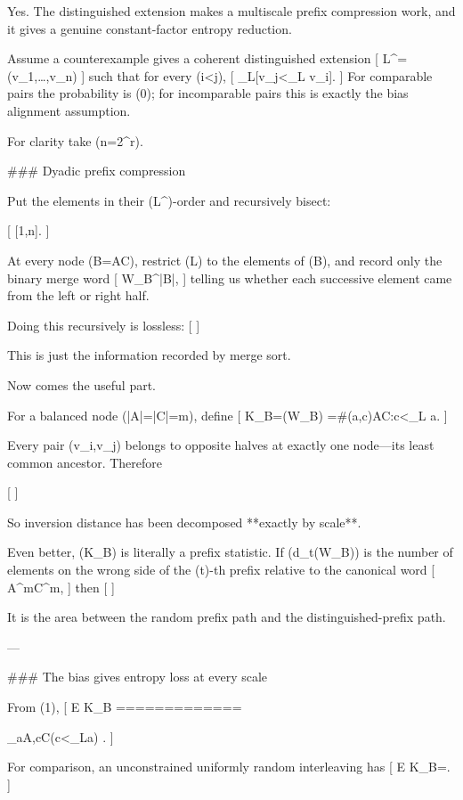 Yes. The distinguished extension makes a multiscale prefix compression work, and it gives a genuine constant-factor entropy reduction.

Assume a counterexample gives a coherent distinguished extension
[
L^\star=(v_1,\dots,v_n)
]
such that for every (i<j),
[
\Pr_L[v_j<_L v_i]\le {}.
]
For comparable pairs the probability is (0); for incomparable pairs this is exactly the bias alignment assumption.

For clarity take (n=2^r).

### Dyadic prefix compression

Put the elements in their (L^\star)-order and recursively bisect:

[
[1,n]\to [1,n/2]\cup[n/2+1,n]\to\cdots.
]

At every node (B=A\sqcup C), restrict (L) to the elements of (B), and record only the binary merge word
[
W_B^{|B|},
]
telling us whether each successive element came from the left or right half.

Doing this recursively is lossless:
[
]

This is just the information recorded by merge sort.

Now comes the useful part.

For a balanced node (|A|=|C|=m), define
[
K_B=(W_B)
=#{(a,c)\in A\times C:c<_L a}.
]

Every pair (v_i,v_j) belongs to opposite halves at exactly one node—its least common ancestor. Therefore

[
]

So inversion distance has been decomposed **exactly by scale**.

Even better, (K_B) is literally a prefix statistic. If (d_t(W_B)) is the number of elements on the wrong side of the (t)-th prefix relative to the canonical word
[
A^mC^m,
]
then
[
]

It is the area between the random prefix path and the distinguished-prefix path.

---

### The bias gives entropy loss at every scale

From (1),
[
\mathbb E K_B
=============

\sum_{a\in A,c\in C}\Pr(c<_La)
\le {}.
]

For comparison, an unconstrained uniformly random interleaving has
[
\mathbb E K_B=.
]

